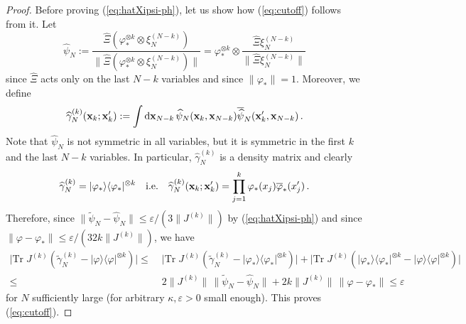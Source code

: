 \documentclass[11pt]{article}
\newcommand{\rd}{{\rm d}}
\newcommand{\bx}{{\bf x}}
\newcommand{\ph}{\varphi}
\newcommand{\e}{\varepsilon}
\newcommand{\tr}{\mbox{Tr}}
\newcommand{\wt}{\widetilde}
\newcommand{\wh}{\widehat}
\begin{document}
\begin{proof}
Before proving (\ref{eq:hatXipsi-ph}), let us show how
(\ref{eq:cutoff}) follows from it. Let
\[ \wh\psi_{N} := \frac{\wh\Xi
\left( \ph_*^{\otimes k} \otimes \xi_N^{(N-k)} \right)}{\|\wh\Xi
\left( \ph_*^{\otimes k} \otimes \xi_N^{(N-k)} \right)\|} =
\ph_*^{\otimes k} \otimes \frac{\wh\Xi \xi_N^{(N-k)}}{\|\wh\Xi
\xi_N^{(N-k)}\|} \] since $\wh \Xi$ acts only on the last $N-k$
variables and since $\| \ph_*\|=1$. Moreover, we define
\[ \wh \gamma_N^{(k)} (\bx_k;\bx'_k) := \int \rd \bx_{N-k} \, \wh
\psi_{N} (\bx_k, \bx_{N-k}) \overline{\wh\psi}_{N}
(\bx'_k,\bx_{N-k})\,. \] Note that $\wh \psi_N$ is not symmetric in
all variables, but it is symmetric in the first $k$ and the last
$N-k$ variables. In particular, $\wh\gamma_N^{(k)}$ is a density
matrix and clearly
\[ \wh \gamma_N^{(k)} =
|\ph_* \rangle \langle \ph_*|^{\otimes k} \quad \text{i.e.} \quad
\wh\gamma_N^{(k)} (\bx_k;\bx'_k) = \prod_{j=1}^k \ph_*(x_j)
\overline{\ph}_* (x'_j) \,.\] Therefore, since
 $\| \wt \psi_N - \wh \psi_{N} \| \leq \e
/(3\| J^{(k)}\|)$ by (\ref{eq:hatXipsi-ph}) and since $\| \ph -
\ph_*\| \leq \e/(32k \|J^{(k)}\|)$, we have
\begin{equation}
\begin{split}
\Big|\tr \; J^{(k)} \left( \wt\gamma^{(k)}_{N} - |\ph \rangle
\langle \ph|^{\otimes k} \right) \Big| \leq \; &\Big|\tr \; J^{(k)}
\left( \wt\gamma^{(k)}_{N} - |\ph_* \rangle \langle \ph_*|^{\otimes
k} \right) \Big| + \Big| \tr \; J^{(k)} \left( |\ph_* \rangle
\langle \ph_*|^{\otimes k} - |\ph\rangle \langle \ph|^{\otimes k}
\right)\Big| \\ \leq \; &2 \| J^{(k)} \| \, \| \wt \psi_N - \wh
\psi_{N} \| + 2k\| J^{(k)}\| \, \| \ph - \ph_* \| \leq \e
\end{split}
\end{equation}
for $N$ sufficiently large (for arbitrary $\kappa, \e
>0$ small enough). This proves (\ref{eq:cutoff}).

\medskip


\end{proof}
\end{document}
